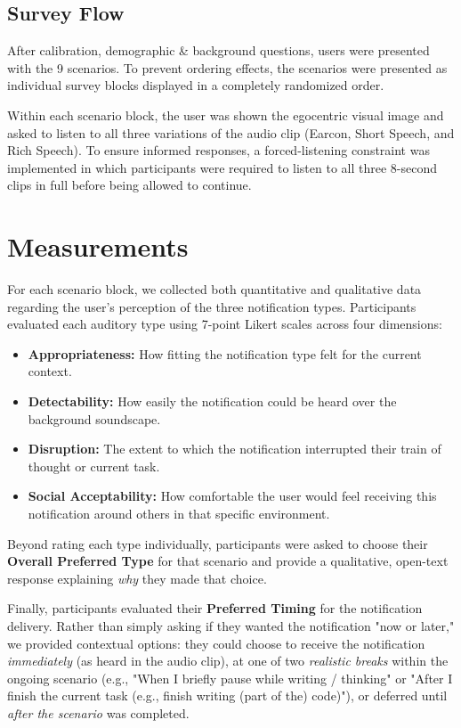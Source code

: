 \subsection{Survey Flow}
After calibration, demographic \& background questions, users were presented with the 9 scenarios. To prevent ordering effects, the scenarios were presented as individual survey blocks displayed in a completely randomized order. 

Within each scenario block, the user was shown the egocentric visual image and asked to listen to all three variations of the audio clip (Earcon, Short Speech, and Rich Speech). To ensure informed responses, a forced-listening constraint was implemented in which participants were required to listen to all three 8-second clips in full before being allowed to continue.

\section{Measurements}
\label{sec:measurements}
For each scenario block, we collected both quantitative and qualitative data regarding the user's perception of the three notification types. Participants evaluated each auditory type using 7-point Likert scales across four dimensions:
\begin{itemize}
    \item \textbf{Appropriateness:} How fitting the notification type felt for the current context.
    \item \textbf{Detectability:} How easily the notification could be heard over the background soundscape.
    \item \textbf{Disruption:} The extent to which the notification interrupted their train of thought or current task.
    \item \textbf{Social Acceptability:} How comfortable the user would feel receiving this notification around others in that specific environment.
\end{itemize}

Beyond rating each type individually, participants were asked to choose their \textbf{Overall Preferred Type} for that scenario and provide a qualitative, open-text response explaining \textit{why} they made that choice. 

Finally, participants evaluated their \textbf{Preferred Timing} for the notification delivery. Rather than simply asking if they wanted the notification "now or later," we provided contextual options: they could choose to receive the notification \textit{immediately} (as heard in the audio clip), at one of two \textit{realistic breaks} within the ongoing scenario (e.g., "When I briefly pause while writing / thinking" or "After I finish the current task (e.g., finish writing (part of the) code)"), or deferred until \textit{after the scenario} was completed.



